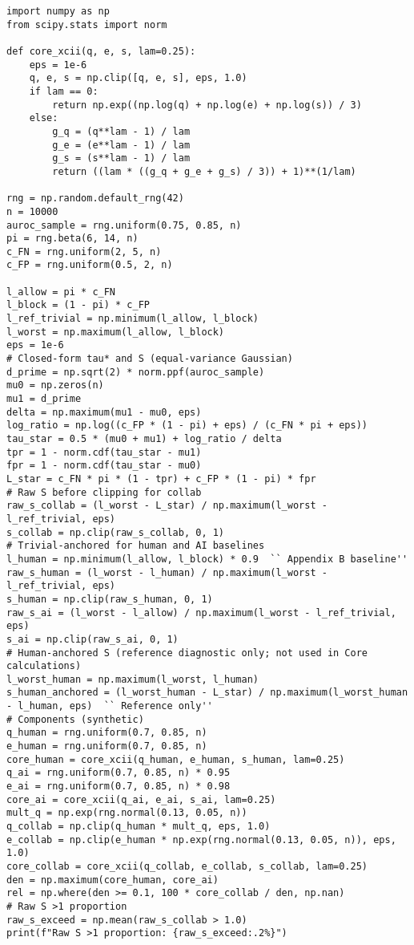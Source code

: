 \documentclass{article}
\begin{document}
\begin{lstlisting}
import numpy as np
from scipy.stats import norm

def core_xcii(q, e, s, lam=0.25):
    eps = 1e-6
    q, e, s = np.clip([q, e, s], eps, 1.0)
    if lam == 0:
        return np.exp((np.log(q) + np.log(e) + np.log(s)) / 3)
    else:
        g_q = (q**lam - 1) / lam
        g_e = (e**lam - 1) / lam
        g_s = (s**lam - 1) / lam
        return ((lam * ((g_q + g_e + g_s) / 3)) + 1)**(1/lam)

rng = np.random.default_rng(42)
n = 10000
auroc_sample = rng.uniform(0.75, 0.85, n)
pi = rng.beta(6, 14, n)
c_FN = rng.uniform(2, 5, n)
c_FP = rng.uniform(0.5, 2, n)

l_allow = pi * c_FN
l_block = (1 - pi) * c_FP
l_ref_trivial = np.minimum(l_allow, l_block)
l_worst = np.maximum(l_allow, l_block)
eps = 1e-6
# Closed-form tau* and S (equal-variance Gaussian)
d_prime = np.sqrt(2) * norm.ppf(auroc_sample)
mu0 = np.zeros(n)
mu1 = d_prime
delta = np.maximum(mu1 - mu0, eps)
log_ratio = np.log((c_FP * (1 - pi) + eps) / (c_FN * pi + eps))
tau_star = 0.5 * (mu0 + mu1) + log_ratio / delta
tpr = 1 - norm.cdf(tau_star - mu1)
fpr = 1 - norm.cdf(tau_star - mu0)
L_star = c_FN * pi * (1 - tpr) + c_FP * (1 - pi) * fpr
# Raw S before clipping for collab
raw_s_collab = (l_worst - L_star) / np.maximum(l_worst - l_ref_trivial, eps)
s_collab = np.clip(raw_s_collab, 0, 1)
# Trivial-anchored for human and AI baselines
l_human = np.minimum(l_allow, l_block) * 0.9  `` Appendix B baseline''
raw_s_human = (l_worst - l_human) / np.maximum(l_worst - l_ref_trivial, eps)
s_human = np.clip(raw_s_human, 0, 1)
raw_s_ai = (l_worst - l_allow) / np.maximum(l_worst - l_ref_trivial, eps)
s_ai = np.clip(raw_s_ai, 0, 1)
# Human-anchored S (reference diagnostic only; not used in Core calculations)
l_worst_human = np.maximum(l_worst, l_human)
s_human_anchored = (l_worst_human - L_star) / np.maximum(l_worst_human - l_human, eps)  `` Reference only''
# Components (synthetic)
q_human = rng.uniform(0.7, 0.85, n)
e_human = rng.uniform(0.7, 0.85, n)
core_human = core_xcii(q_human, e_human, s_human, lam=0.25)
q_ai = rng.uniform(0.7, 0.85, n) * 0.95
e_ai = rng.uniform(0.7, 0.85, n) * 0.98
core_ai = core_xcii(q_ai, e_ai, s_ai, lam=0.25)
mult_q = np.exp(rng.normal(0.13, 0.05, n))
q_collab = np.clip(q_human * mult_q, eps, 1.0)
e_collab = np.clip(e_human * np.exp(rng.normal(0.13, 0.05, n)), eps, 1.0)
core_collab = core_xcii(q_collab, e_collab, s_collab, lam=0.25)
den = np.maximum(core_human, core_ai)
rel = np.where(den >= 0.1, 100 * core_collab / den, np.nan)
# Raw S >1 proportion
raw_s_exceed = np.mean(raw_s_collab > 1.0)
print(f"Raw S >1 proportion: {raw_s_exceed:.2%}")


\end{lstlisting}
\end{document}
